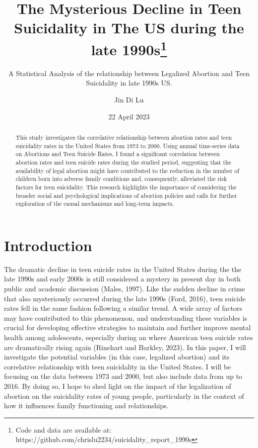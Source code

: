 \documentclass[
  letterpaper,
  DIV=11,
  numbers=noendperiod]{scrartcl}
\title{The Mysterious Decline in Teen Suicidality in The US during the
late 1990s\thanks{Code and data are available at:
https://github.com/chrislu2234/suicidality\_report\_1990s}}
\subtitle{A Statistical Analysis of the relationship between Legalized
Abortion and Teen Suicidality in late 1990s US.}
\author{Jin Di Lu}
\date{22 April 2023}
\begin{document}
\maketitle
\begin{abstract}
This study investigates the correlative relationship between abortion
rates and teen suicidality rates in the United States from 1973 to 2000.
Using annual time-series data on Abortions and Teen Suicide Rates, I
found a significant correlation between abortion rates and teen suicide
rates during the studied period, suggesting that the availability of
legal abortion might have contributed to the reduction in the number of
children born into adverse family conditions and, consequently,
alleviated the risk factors for teen suicidality. This research
highlights the importance of considering the broader social and
psychological implications of abortion policies and calls for further
exploration of the causal mechanisms and long-term impacts.
\end{abstract}
\ifdefined\Shaded\renewenvironment{Shaded}{\begin{tcolorbox}[sharp corners, borderline west={3pt}{0pt}{shadecolor}, boxrule=0pt, breakable, frame hidden, enhanced, interior hidden]}{\end{tcolorbox}}\fi

\hypertarget{introduction}{%
\section{Introduction}\label{introduction}}

The dramatic decline in teen suicide rates in the United States during
the the late 1990s and early 2000s is still considered a mystery in
present day in both public and academic discussion (Males, 1997). Like
the sudden decline in crime that also mysteriously occurred during the
late 1990s (Ford, 2016), teen suicide rates fell in the same fashion
following a similar trend. A wide array of factors may have contributed
to this phenomenon, and understanding these variables is crucial for
developing effective strategies to maintain and further improve mental
health among adolescents, especially during an where American teen
suicide rates are dramatically rising again (Rinehart and Barkley,
2023). In this paper, I will investigate the potential variables (in
this case, legalized abortion) and its correlative relationship with
teen suicidality in the United States. I will be focusing on the data
between 1973 and 2000, but also include data from up to 2016. By doing
so, I hope to shed light on the impact of the legalization of abortion
on the suicidality rates of young people, particularly in the context of
how it influences family functioning and relationships.
\end{document}
